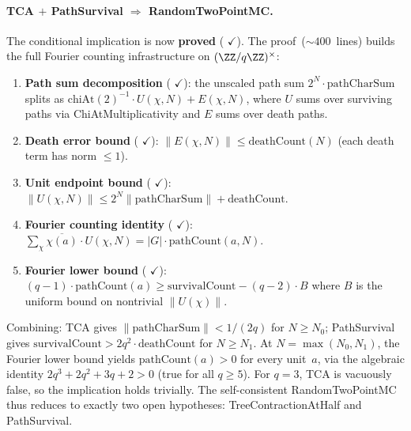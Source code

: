 \paragraph{TCA $+$ PathSurvival $\Rightarrow$ RandomTwoPointMC.}
The conditional implication is now \textbf{proved}
(
{\color{leanink}$\checkmark$}).
The proof~(${\sim}400$~lines) builds the full Fourier counting
infrastructure on $(\ZZ/q\ZZ)^\times$:
\begin{enumerate}[nosep]
\item \textbf{Path sum decomposition}
  (
  {\color{leanink}$\checkmark$}):
  the unscaled path sum
  $2^N \cdot \mathrm{pathCharSum}$ splits as
  $\mathrm{chiAt}(2)^{-1}\cdot U(\chi,N) + E(\chi,N)$,
  where $U$ sums over surviving paths via ChiAtMultiplicativity and
  $E$ sums over death paths.

\item \textbf{Death error bound}
  (
  {\color{leanink}$\checkmark$}):
  $\|E(\chi,N)\| \leq \mathrm{deathCount}(N)$
  (each death term has norm $\leq 1$).

\item \textbf{Unit endpoint bound}
  (
  {\color{leanink}$\checkmark$}):
  $\|U(\chi,N)\| \leq 2^N\|\mathrm{pathCharSum}\| + \mathrm{deathCount}$.

\item \textbf{Fourier counting identity}
  (
  {\color{leanink}$\checkmark$}):
  $\sum_\chi \overline{\chi(a)} \cdot U(\chi,N)
  = |G| \cdot \mathrm{pathCount}(a,N)$.

\item \textbf{Fourier lower bound}
  (
  {\color{leanink}$\checkmark$}):
  $(q{-}1)\cdot\mathrm{pathCount}(a) \geq
  \mathrm{survivalCount} - (q{-}2)\cdot B$
  where $B$ is the uniform bound on nontrivial $\|U(\chi)\|$.
\end{enumerate}
Combining: TCA gives $\|\mathrm{pathCharSum}\| < 1/(2q)$ for
$N \geq N_0$; PathSurvival gives
$\mathrm{survivalCount} > 2q^2 \cdot \mathrm{deathCount}$ for
$N \geq N_1$.  At $N = \max(N_0,N_1)$, the Fourier lower bound yields
$\mathrm{pathCount}(a) > 0$ for every unit~$a$, via the algebraic
identity $2q^3 + 2q^2 + 3q + 2 > 0$ (true for all $q \geq 5$).
For $q = 3$, TCA is vacuously false, so the implication holds trivially.
The self-consistent RandomTwoPointMC thus reduces to exactly two open
hypotheses: TreeContractionAtHalf and PathSurvival.

